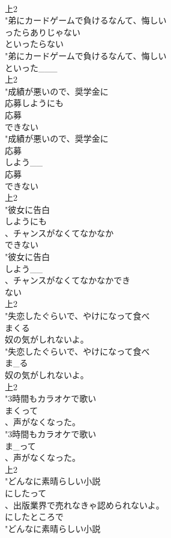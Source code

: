 \documentclass[8pt]{extreport}
\begin{document}
\begin{CJK}{UTF8}{min}
\\	上2
\\	"弟にカードゲームで負けるなんて、悔しい
\\	ったらありじゃない
\\	といったらない
\\	"弟にカードゲームで負けるなんて、悔しい
\\	といった___
\\	上2
\\	"成績が悪いので、奨学金に
\\	応募しようにも
\\	応募
\\	できない
\\	"成績が悪いので、奨学金に
\\	応募
\\	しよう__
\\	応募
\\	できない
\\	上2
\\	"彼女に告白
\\	しようにも
\\	、チャンスがなくてなかなか
\\	できない
\\	"彼女に告白
\\	しよう__
\\	、チャンスがなくてなかなかでき
\\	ない
\\	上2
\\	"失恋したぐらいで、やけになって食べ
\\	まくる
\\	奴の気がしれないよ。
\\	"失恋したぐらいで、やけになって食べ
\\	ま_る
\\	奴の気がしれないよ。
\\	上2
\\	"3時間もカラオケで歌い
\\	まくって
\\	、声がなくなった。
\\	"3時間もカラオケで歌い
\\	ま_って
\\	、声がなくなった。
\\	上2
\\	"どんなに素晴らしい小説
\\	にしたって
\\	、出版業界で売れなきゃ認められないよ。
\\	にしたところで
\\	"どんなに素晴らしい小説

\end{CJK}
\end{document}
